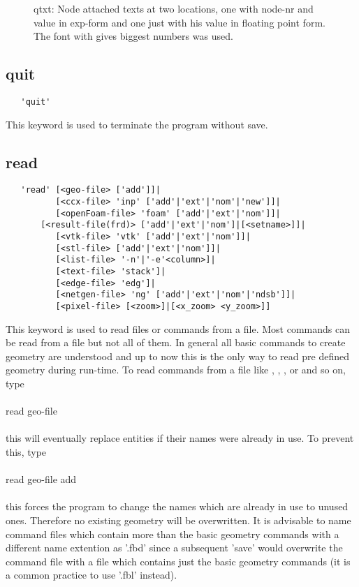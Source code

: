 \documentclass{article}
\begin{document}
\begin{figure}[h]
\caption{\label{qtxtp}qtxt: Node attached texts at two locations, one with node-nr and value in exp-form and one just with his value in floating point form. The font with gives biggest numbers was used.}
\end{figure}

\subsection{\label{quit}quit}
\begin{verbatim}
   'quit' 
\end{verbatim}
This keyword is used to terminate the program without save. 

\subsection{\label{read}read}
\begin{verbatim}
   'read' [<geo-file> ['add']]|
          [<ccx-file> 'inp' ['add'|'ext'|'nom'|'new']]|
          [<openFoam-file> 'foam' ['add'|'ext'|'nom']]|
       [<result-file(frd)> ['add'|'ext'|'nom']|[<setname>]]|
          [<vtk-file> 'vtk' ['add'|'ext'|'nom']]|
          [<stl-file> ['add'|'ext'|'nom']]|
          [<list-file> '-n'|'-e'<column>]|
          [<text-file> 'stack']|
          [<edge-file> 'edg']|
          [<netgen-file> 'ng' ['add'|'ext'|'nom'|'ndsb']]|
          [<pixel-file> [<zoom>]|[<x_zoom> <y_zoom>]]
\end{verbatim}
This keyword is used to read files or commands from a file. Most commands can be read from a file but not all of them. In general all basic commands to create geometry are understood and up to now this is the only way to read pre defined geometry during run-time. To read commands from a file like , , , or  and so on, type\\\\read geo-file\\\\this will eventually replace entities if their names were already in use. To prevent this, type\\\\read geo-file add\\\\this forces the program to change the names which are already in use to unused ones. Therefore no existing geometry will be overwritten. It is advisable to name command files which contain more than the basic geometry commands with a different name extention as '.fbd' since a subsequent 'save' would overwrite the command file with a file which contains just the basic geometry commands (it is a common practice to use '.fbl' instead). 
\end{document}
